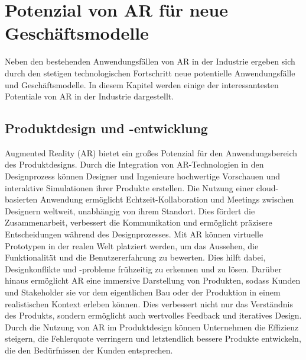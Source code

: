 \section{Potenzial von AR für neue Geschäftsmodelle}

Neben den bestehenden Anwendungsfällen von AR in der Industrie ergeben sich
durch den stetigen technologischen Fortschritt neue potentielle Anwendungsfälle
und Geschäftsmodelle. In diesem Kapitel werden einige der interessantesten
Potentiale von AR in der Industrie dargestellt.

\subsection{Produktdesign und -entwicklung}
Augmented Reality (AR) bietet ein großes Potenzial für den Anwendungsbereich
des Produktdesigns. Durch die Integration von AR-Technologien in den
Designprozess können Designer und Ingenieure hochwertige Vorschauen und
interaktive Simulationen ihrer Produkte erstellen. Die Nutzung einer
cloud-basierten Anwendung ermöglicht Echtzeit-Kollaboration und Meetings
zwischen Designern weltweit, unabhängig von ihrem Standort. Dies fördert die
Zusammenarbeit, verbessert die Kommunikation und ermöglicht präzisere
Entscheidungen während des Designprozesses. Mit AR können virtuelle Prototypen
in der realen Welt platziert werden, um das Aussehen, die Funktionalität und
die Benutzererfahrung zu bewerten. Dies hilft dabei, Designkonflikte und
-probleme frühzeitig zu erkennen und zu lösen. Darüber hinaus ermöglicht AR
eine immersive Darstellung von Produkten, sodass Kunden und Stakeholder sie vor
dem eigentlichen Bau oder der Produktion in einem realistischen Kontext erleben
können. Dies verbessert nicht nur das Verständnis des Produkts, sondern
ermöglicht auch wertvolles Feedback und iteratives Design. Durch die Nutzung
von AR im Produktdesign können Unternehmen die Effizienz steigern, die
Fehlerquote verringern und letztendlich bessere Produkte entwickeln, die den
Bedürfnissen der Kunden entsprechen.\cite{mourtzis2020augmented}

